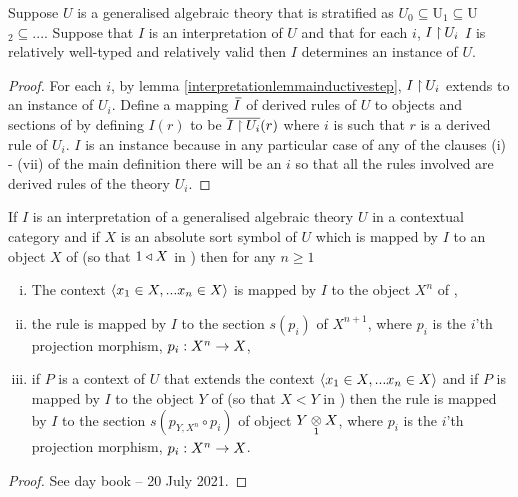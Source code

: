 \newpage
\begin{lemma}
Suppose $U$ is a  generalised algebraic theory that is stratified as  $U_0 \subseteq $U$_1 \subseteq $U$_2 \subseteq ...$. 
 Suppose that $I$ is an interpretation of $U$  and that  for each $i$, $I \restrict U_i$  
$I$ is relatively well-typed and relatively valid then $I$ determines an instance of $U$.
\end{lemma}
\begin{proof}
For each $i$, by lemma \ref{interpretationlemmainductivestep}, $I \restrict U_i$ extends to an instance of $U_i$. Define a mapping
$\Ibar$ of derived rules of $U$ to objects and sections of \catcw by defining $I(r)$ to be $\overline{I \restrict U_i}(r)$ where
$i$ is such that $r$ is a derived rule of $U_i$. $I$ is an instance because in any particular case of any of the clauses (i) - (vii) of the main definition 
there will be an $i$ so that all the rules involved are derived rules of the theory $U_i$. 
\end{proof}


\begin{lemma}
If $I$ is an interpretation of a generalised algebraic theory $U$ in a contextual category \catcw and if $X$ is an absolute sort symbol of $U$ which is mapped 
by $I$ to an object $X$ of \catcw (so that $1 \base X$ in \catc) then for any $n \geq 1$ 
\begin{enumerate}[(i)]
\item
The context $\tuple{\ofT{x_1}{X},...\ofT{x_n}{X}}$ is mapped by $I$ to the object $X^n$ of \catc,
\item the rule 
 is mapped by $I$ to the section $s(p_i)$ of $X^{n+1}$, where $p_i$ is the $i$'th projection morphism, $p_i: X^n \morph X$,
\item if $P$ is a context of $U$ that extends the context $\tuple{\ofT{x_1}{X},...\ofT{x_n}{X}}$ and if $P$ is mapped by $I$ to
the object $Y$ of \catcw (so that $X < Y$ in \catc) then the rule 
 is mapped by $I$ to the section $s(p_{Y,X^n}\circ p_i)$ of object $\crossx{Y}{X}{1}$, where $p_i$ is the $i$'th projection morphism, $p_i: X^n \morph X$.
\end{enumerate}
\end{lemma}
\begin{proof}
See day book -- 20 July 2021.
\end{proof}